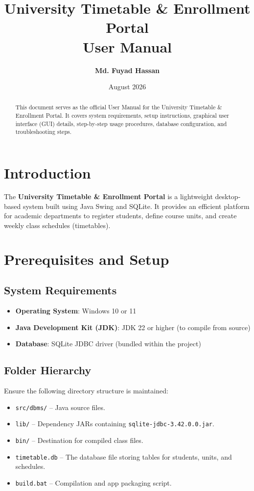 \documentclass[11pt,a4paper]{article}
\title{\textbf{University Timetable \& Enrollment Portal \\ User Manual}}
\author{\textbf{Md. Fuyad Hassan}}
\date{August 2026}
\begin{document}
\maketitle

\begin{abstract}
This document serves as the official User Manual for the University Timetable \& Enrollment Portal. It covers system requirements, setup instructions, graphical user interface (GUI) details, step-by-step usage procedures, database configuration, and troubleshooting steps.
\end{abstract}

\section{Introduction}
The \textbf{University Timetable \& Enrollment Portal} is a lightweight desktop-based system built using Java Swing and SQLite. It provides an efficient platform for academic departments to register students, define course units, and create weekly class schedules (timetables).

\section{Prerequisites and Setup}

\subsection{System Requirements}
\begin{itemize}
    \item \textbf{Operating System}: Windows 10 or 11
    \item \textbf{Java Development Kit (JDK)}: JDK 22 or higher (to compile from source)
    \item \textbf{Database}: SQLite JDBC driver (bundled within the project)
\end{itemize}

\subsection{Folder Hierarchy}
Ensure the following directory structure is maintained:
\begin{itemize}
    \item \texttt{src/dbms/} -- Java source files.
    \item \texttt{lib/} -- Dependency JARs containing \texttt{sqlite-jdbc-3.42.0.0.jar}.
    \item \texttt{bin/} -- Destination for compiled class files.
    \item \texttt{timetable.db} -- The database file storing tables for students, units, and schedules.
    \item \texttt{build.bat} -- Compilation and app packaging script.
\end{itemize}
\end{document}
